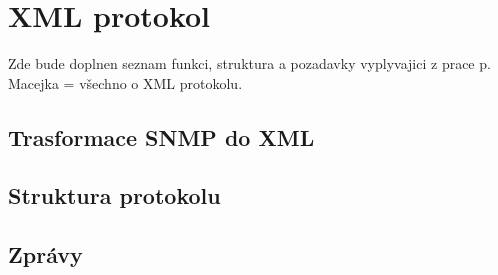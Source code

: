 \chapter{XML protokol}
\label{kap_xml}
Zde  bude doplnen seznam funkci, struktura a pozadavky vyplyvajici z prace p. Macejka = všechno o XML protokolu.

\section{Trasformace SNMP do XML}

\section{Struktura protokolu}

\section{Zprávy}


